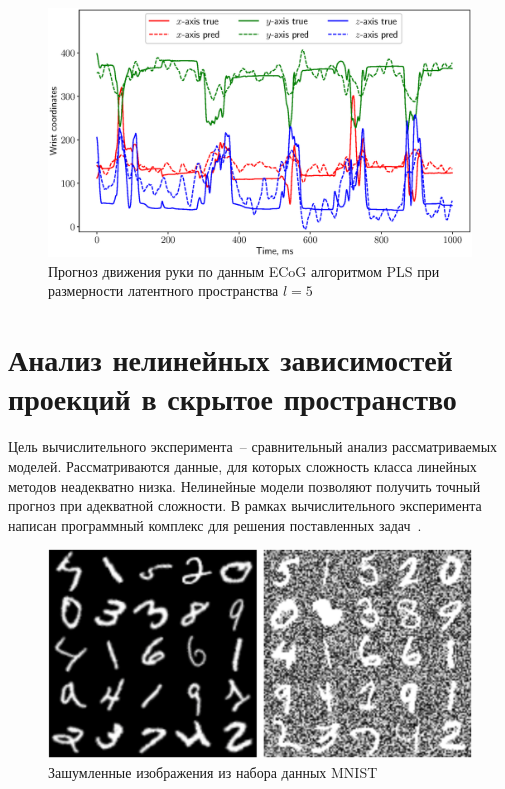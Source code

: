 \begin{figure}[ht]
	\centering
	\includegraphics[width=\textwidth]{figs/ch1/ecog_prediction}
	\caption{Прогноз движения руки по данным ECoG алгоритмом PLS при размерности латентного пространства $l=5$}
	\label{ch1:fig:ecog_prediction}
\end{figure}

\section{Анализ нелинейных зависимостей проекций в скрытое пространство}
Цель вычислительного эксперимента~-- сравнительный анализ рассматриваемых моделей.
Рассматриваются данные, для которых сложность класса линейных методов неадекватно низка.
Нелинейные модели позволяют получить точный прогноз при адекватной сложности.
В рамках вычислительного эксперимента написан программный комплекс для решения поставленных задач~\cite{source_code}.

\begin{figure}[!tp]
\centering 
\includegraphics[width=\linewidth]{figs/ch2/noisy_mnist}
\caption{Зашумленные изображения из набора данных MNIST}
\label{fgr:1}
\end{figure}


